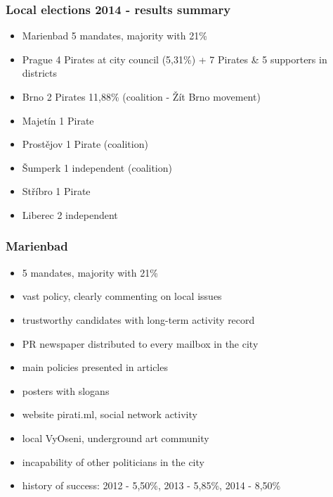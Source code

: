 \begin{frame}
	\frametitle{Local elections 2014 - results summary}
	\begin{itemize}
	\item Marienbad 5 mandates, majority with 21\%
	\item Prague 4 Pirates at city council (5,31\%) + 7 Pirates \& 5 supporters in districts
	\item Brno 2 Pirates 11,88\% (coalition - \v{Z}\'it Brno movement)
	\item Majet\'in 1 Pirate
	\item Prost\v{e}jov 1 Pirate (coalition)
	\item \v{S}umperk 1 independent (coalition)
	\item St\v{r}\'ibro 1 Pirate
	\item Liberec 2 independent
	\end{itemize}
\end{frame}
\begin{frame}
	\frametitle{Marienbad}
	\begin{itemize}
	\item 5 mandates, majority with 21\%
	\item vast policy, clearly commenting on local issues
	\item trustworthy candidates with long-term activity record
	\item PR newspaper distributed to every mailbox in the city
	\item main policies presented in articles
	\item posters with slogans
	\item website pirati.ml, social network activity
	\item local VyOseni, underground art community
	\item incapability of other politicians in the city
	\item history of success: 2012 - 5,50\%, 2013 - 5,85\%, 2014 - 8,50\%
	\end{itemize}
\end{frame}
